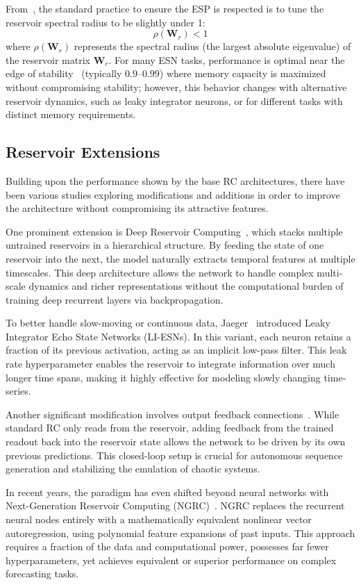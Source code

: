 \documentclass{sapthesis}
\begin{document}
From~\cite{jaeger2001echo}, the standard practice to ensure the ESP is respected is to tune the reservoir spectral radius to be slightly under 1:
\[
  \rho(\mathbf{W}_r) < 1
\]
where $\rho(\mathbf{W}_r)$ represents the spectral radius (the largest absolute eigenvalue) of the reservoir matrix $\mathbf{W}_r$. For many ESN tasks, performance is optimal near the edge of stability~\cite{basterrech2017empiricalanalysisnecessarysufficient} (typically $0.9$--$0.99$) where memory capacity is maximized without compromising stability; however, this behavior changes with alternative reservoir dynamics, such as leaky integrator neurons, or for different tasks with distinct memory requirements.
\subsection{Reservoir Extensions}
Building upon the performance shown by the base RC architectures, there have been various studies exploring modifications and additions in order to improve the architecture without compromising its attractive features.

One prominent extension is Deep Reservoir Computing~\cite{Gallicchio2016DeepRC}, which stacks multiple untrained reservoirs in a hierarchical structure. By feeding the state of one reservoir into the next, the model naturally extracts temporal features at multiple timescales. This deep architecture allows the network to handle complex multi-scale dynamics and richer representations without the computational burden of training deep recurrent layers via backpropagation.

To better handle slow-moving or continuous data, Jaeger~\cite{JAEGER2007335} introduced Leaky Integrator Echo State Networks (LI-ESNs). In this variant, each neuron retains a fraction of its previous activation, acting as an implicit low-pass filter. This leak rate hyperparameter enables the reservoir to integrate information over much longer time spans, making it highly effective for modeling slowly changing time-series.

Another significant modification involves output feedback connections~\cite{Lukosevicius2007}. While standard RC only reads from the reservoir, adding feedback from the trained readout back into the reservoir state allows the network to be driven by its own previous predictions. This closed-loop setup is crucial for autonomous sequence generation and stabilizing the emulation of chaotic systems.

In recent years, the paradigm has even shifted beyond neural networks with Next-Generation Reservoir Computing (NGRC)~\cite{Gauthier_2021}. NGRC replaces the recurrent neural nodes entirely with a mathematically equivalent nonlinear vector autoregression, using polynomial feature expansions of past inputs. This approach requires a fraction of the data and computational power, possesses far fewer hyperparameters, yet achieves equivalent or superior performance on complex forecasting tasks.
\end{document}
